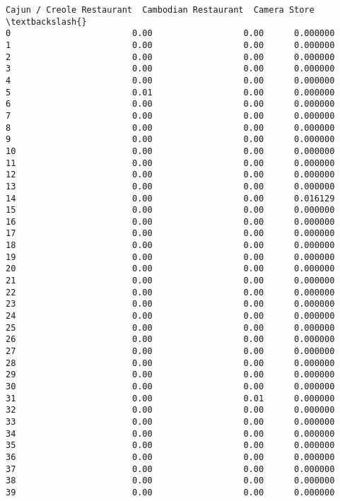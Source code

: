 \documentclass[11pt]{article}
\begin{document}
\begin{tcolorbox}[breakable, size=fbox, boxrule=.5pt, pad at break*=1mm, opacityfill=0]
\begin{Verbatim}[commandchars=\\\{\}]
    Cajun / Creole Restaurant  Cambodian Restaurant  Camera Store  \textbackslash{}
0                        0.00                  0.00      0.000000
1                        0.00                  0.00      0.000000
2                        0.00                  0.00      0.000000
3                        0.00                  0.00      0.000000
4                        0.00                  0.00      0.000000
5                        0.01                  0.00      0.000000
6                        0.00                  0.00      0.000000
7                        0.00                  0.00      0.000000
8                        0.00                  0.00      0.000000
9                        0.00                  0.00      0.000000
10                       0.00                  0.00      0.000000
11                       0.00                  0.00      0.000000
12                       0.00                  0.00      0.000000
13                       0.00                  0.00      0.000000
14                       0.00                  0.00      0.016129
15                       0.00                  0.00      0.000000
16                       0.00                  0.00      0.000000
17                       0.00                  0.00      0.000000
18                       0.00                  0.00      0.000000
19                       0.00                  0.00      0.000000
20                       0.00                  0.00      0.000000
21                       0.00                  0.00      0.000000
22                       0.00                  0.00      0.000000
23                       0.00                  0.00      0.000000
24                       0.00                  0.00      0.000000
25                       0.00                  0.00      0.000000
26                       0.00                  0.00      0.000000
27                       0.00                  0.00      0.000000
28                       0.00                  0.00      0.000000
29                       0.00                  0.00      0.000000
30                       0.00                  0.00      0.000000
31                       0.00                  0.01      0.000000
32                       0.00                  0.00      0.000000
33                       0.00                  0.00      0.000000
34                       0.00                  0.00      0.000000
35                       0.00                  0.00      0.000000
36                       0.00                  0.00      0.000000
37                       0.00                  0.00      0.000000
38                       0.00                  0.00      0.000000
39                       0.00                  0.00      0.000000


\end{Verbatim}
\end{tcolorbox}
\end{document}
